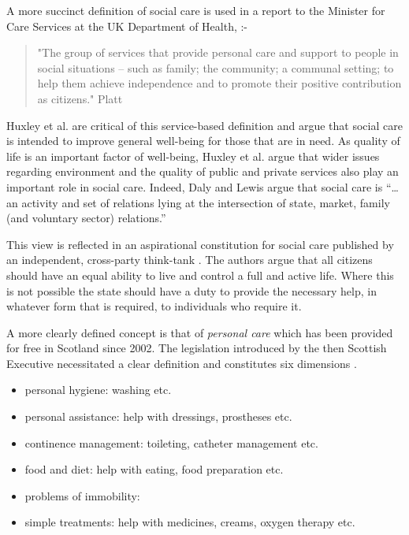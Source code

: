 \documentclass[12pt,]{report}
\begin{document}
A more succinct definition of social care is used in a report to the
Minister for Care Services at the UK Department of Health, :-

\begin{quotation}
    "The group of services that provide personal care and support to people in social situations – such as family; the community; a communal setting; to help them achieve independence and to promote their positive contribution as citizens." Platt 
\end{quotation}

\citeyearpar[pp.~4]{RN154}

Huxley et al. \citeyearpar{RN153} are critical of this service-based
definition and argue that social care is intended to improve general
well-being for those that are in need. As quality of life is an
important factor of well-being, Huxley et al. \citeyearpar{RN153} argue
that wider issues regarding environment and the quality of public and
private services also play an important role in social care. Indeed,
Daly and Lewis \citeyearpar[pp.287]{RN146} argue that social care is
``\ldots{}an activity and set of relations lying at the intersection of
state, market, family (and voluntary sector) relations.''

This view is reflected in an aspirational constitution for social care
published by an independent, cross-party think-tank \citep{RN136}. The
authors argue that all citizens should have an equal ability to live and
control a full and active life. Where this is not possible the state
should have a duty to provide the necessary help, in whatever form that
is required, to individuals who require it.

A more clearly defined concept is that of \textit{personal care} which
has been provided for free in Scotland since 2002. The legislation
introduced by the then Scottish Executive necessitated a clear
definition and constitutes six dimensions \citep[pp.256]{RN373}.

\begin{itemize}[noitemsep]
\item personal hygiene: washing etc.  
\item personal assistance: help with dressings, prostheses etc.  
\item continence management: toileting, catheter management etc.  
\item food and diet: help with eating, food preparation etc.  
\item problems of immobility:  
\item simple treatments: help with medicines, creams, oxygen therapy etc. 
\end{itemize}
\end{document}

